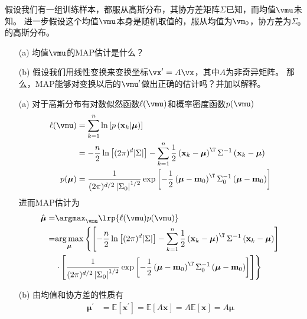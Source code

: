 \documentclass[reportComp]{thesis}
\begin{document}
\begin{question}[\textsection 3 Q19]
假设我们有一组训练样本，都服从高斯分布，其协方差矩阵$\Sigma$已知，而均值$\vmu$未知。
进一步假设这个均值$\vmu$本身是随机取值的，服从均值为$\vm_0$，协方差为$\Sigma_0$的高斯分布。
\begin{itemize}
	\item [(a)] 均值$\vmu$的MAP估计是什么？
	\item [(b)] 假设我们用线性变换来变换坐标$\vx'=A\vx$，其中$A$为非奇异矩阵。
	那么，MAP能够对变换以后的$\vmu'$做出正确的估计吗？并加以解释。
\end{itemize}
\end{question}
\begin{answer}
\begin{itemize}
	\item [(a)] 对于高斯分布有对数似然函数$\ell(\vmu)$和概率密度函数$p(\vmu)$
	\[\begin{aligned}
	\ell(\vmu)
	&=\sum_{k=1}^{n} \ln \left[p\left(\mathbf{x}_{k} | \boldsymbol{\mu}\right)\right] \\
	&=-\frac{n}{2} \ln \left[(2 \pi)^{d}|\Sigma|\right]-\sum_{k=1}^{n} \frac{1}{2}\left(\mathbf{x}_{k}-\boldsymbol{\mu}\right)^{\T} \Sigma^{-1}\left(\mathbf{x}_{k}-\boldsymbol{\mu}\right)\\
	p(\boldsymbol{\mu})&=\frac{1}{(2 \pi)^{d / 2}\left|\Sigma_{0}\right|^{1 / 2}} \exp \left[-\frac{1}{2}\left(\boldsymbol{\mu}-\mathbf{m}_{0}\right)^{\T} \Sigma_{0}^{-1}\left(\boldsymbol{\mu}-\mathbf{m}_{0}\right)\right]
	\end{aligned}\]
	进而MAP估计为
	\[\begin{aligned} \hat{\boldsymbol{\mu}}
	=&\argmax_{\vmu}\lrp{\ell(\vmu)p(\vmu)}\\
	=& \underset{\boldsymbol{\mu}}{\arg \max }\left\{\left[-\frac{n}{2} \ln \left[(2 \pi)^{d}|\Sigma|\right]-\sum_{k=1}^{n} \frac{1}{2}\left(\mathbf{x}_{k}-\boldsymbol{\mu}\right)^{\T} \Sigma^{-1}\left(\mathbf{x}_{k}-\boldsymbol{\mu}\right)\right]\right.\\
	&\left. \cdot\left[\frac{1}{(2 \pi)^{d / 2}\left|\Sigma_{0}\right|^{1 / 2}} \exp \left[-\frac{1}{2}\left(\boldsymbol{\mu}-\mathbf{m}_{0}\right)^{\T} \Sigma_{0}^{-1}\left(\boldsymbol{\mu}-\mathbf{m}_{0}\right)\right]\right]\right\}
	\end{aligned}\]
	\item [(b)] 由均值和协方差的性质有
	\[\begin{aligned}\boldsymbol{\mu}^{\prime}&= \mathbb{E}\left[\mathbf{x}^{\prime}\right]=\mathbb{E}[A \mathbf{x}]=A \mathbb{E}[\mathbf{x}]=A \boldsymbol{\mu}\\

\end{aligned}\]
\end{itemize}
\end{answer}
\end{document}
